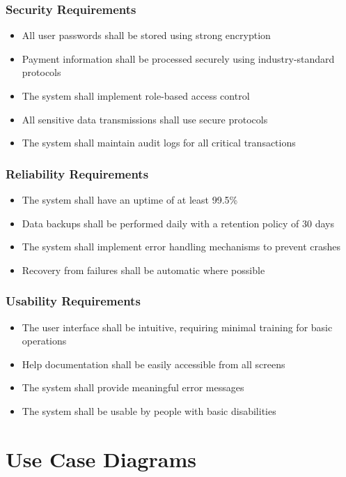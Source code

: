 \documentclass[12pt,a4paper]{report}
\begin{document}
\subsection{Security Requirements}
\begin{itemize}
    \item All user passwords shall be stored using strong encryption
    \item Payment information shall be processed securely using industry-standard protocols
    \item The system shall implement role-based access control
    \item All sensitive data transmissions shall use secure protocols
    \item The system shall maintain audit logs for all critical transactions
\end{itemize}

\subsection{Reliability Requirements}
\begin{itemize}
    \item The system shall have an uptime of at least 99.5\%
    \item Data backups shall be performed daily with a retention policy of 30 days
    \item The system shall implement error handling mechanisms to prevent crashes
    \item Recovery from failures shall be automatic where possible
\end{itemize}

\subsection{Usability Requirements}
\begin{itemize}
    \item The user interface shall be intuitive, requiring minimal training for basic operations
    \item Help documentation shall be easily accessible from all screens
    \item The system shall provide meaningful error messages
    \item The system shall be usable by people with basic disabilities
\end{itemize}

\chapter{Use Case Diagrams}
\end{document}
